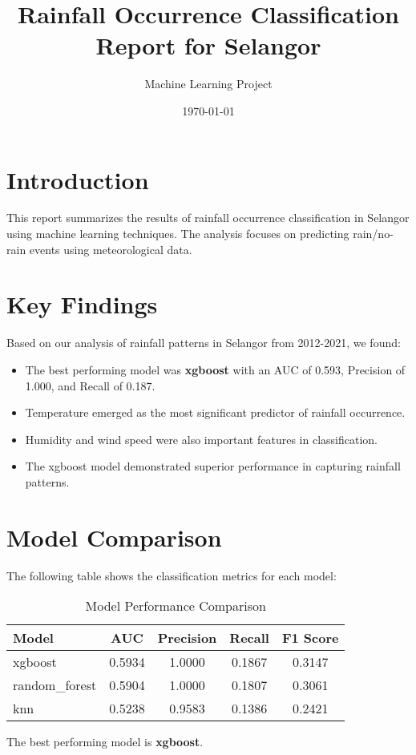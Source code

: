 \documentclass{article}
\title{Rainfall Occurrence Classification Report for Selangor}
\author{Machine Learning Project}
\date{\today}
\begin{document}
\maketitle

\section{Introduction}
This report summarizes the results of rainfall occurrence classification in Selangor using machine learning techniques. 
The analysis focuses on predicting rain/no-rain events using meteorological data.

\section{Key Findings}
Based on our analysis of rainfall patterns in Selangor from 2012-2021, we found:
\begin{itemize}
    \item The best performing model was \textbf{xgboost} with an AUC of 0.593, Precision of 1.000, and Recall of 0.187.
    \item Temperature emerged as the most significant predictor of rainfall occurrence.
    \item Humidity and wind speed were also important features in classification.
    \item The xgboost model demonstrated superior performance in capturing rainfall patterns.
\end{itemize}

\section{Model Comparison}
The following table shows the classification metrics for each model:

\begin{table}[h]
\centering
\caption{Model Performance Comparison}
\begin{tabular}{lcccc}
\toprule
Model & AUC & Precision & Recall & F1 Score \\
\midrule
xgboost & 0.5934 & 1.0000 & 0.1867 & 0.3147 \\
random\_forest & 0.5904 & 1.0000 & 0.1807 & 0.3061 \\
knn & 0.5238 & 0.9583 & 0.1386 & 0.2421 \\
\bottomrule
\end{tabular}
\end{table}

The best performing model is \textbf{xgboost}.
\end{document}
